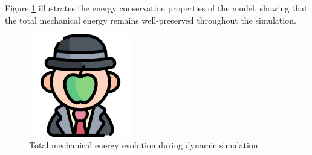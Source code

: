 Figure \ref{fig:dynamic_energy_conservation} illustrates the energy conservation properties of the model, showing that the total mechanical energy remains well-preserved throughout the simulation.

\begin{figure}[H]
    \centering
    \includegraphics[width=0.4\textwidth]{Images/dummy.png}
    \caption{Total mechanical energy evolution during dynamic simulation.}
    \label{fig:dynamic_energy_conservation}
\end{figure}
